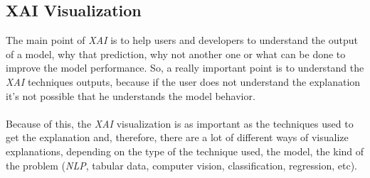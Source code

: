 \subsection{XAI Visualization}
\noindent The main point of \emph{XAI} is to help users and developers to understand the output of a model, why that prediction, why not another one or what can be done to improve the model performance. So, a really important point is to understand the \emph{XAI} techniques outputs, because if the user does not understand the explanation it's not possible that he understands the model behavior. 
\paragraph{}
Because of this, the \emph{XAI} visualization is as important as the techniques used to get the explanation and, therefore, there are a lot of different ways of visualize explanations, depending on the type of the technique used, the model, the kind of the problem (\emph{NLP}, tabular data, computer vision, classification, regression, etc). 
